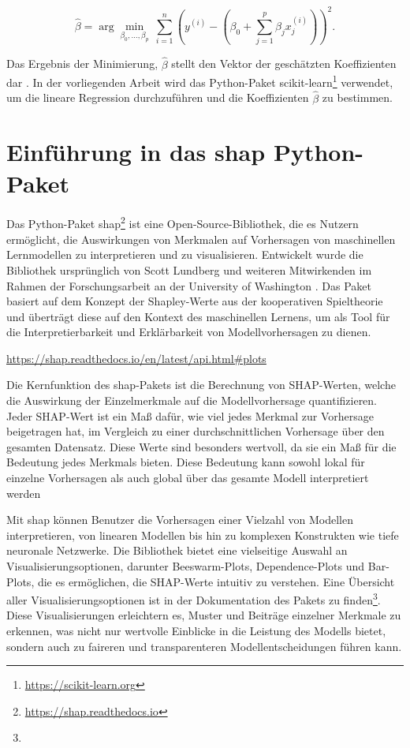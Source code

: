 \begin{equation}
    \hat{\beta} = \arg \underset{\beta_0, \ldots, \beta_p}{\min} \ \sum_{i=1}^{n} \left( y^{(i)} - \left( \beta_0 + \sum_{j=1}^{p} \beta_j x_j^{(i)}\right)\right)^2.
\end{equation}

Das Ergebnis der Minimierung, \( \hat{\beta} \) stellt den Vektor der geschätzten Koeffizienten dar \cite[S. 37]{Molnar_2022}. 
In der vorliegenden Arbeit wird das Python-Paket \textsf{scikit-learn}\footnote{\url{https://scikit-learn.org}} verwendet, um die lineare Regression durchzuführen und die Koeffizienten 
\( \hat{\beta} \) zu bestimmen. 


\section{Einführung in das \textsf{shap} Python-Paket}
\label{sec:shap-package}

Das Python-Paket \textsf{shap}\footnote{\url{https://shap.readthedocs.io}} ist eine Open-Source-Bibliothek, die es Nutzern ermöglicht, 
die Auswirkungen von Merkmalen auf Vorhersagen von maschinellen Lernmodellen zu interpretieren und zu visualisieren. 
Entwickelt wurde die Bibliothek ursprünglich von Scott Lundberg und weiteren Mitwirkenden im Rahmen der Forschungsarbeit 
an der University of Washington \cite{NIPS2017_8a20a862}. Das Paket basiert auf dem Konzept der Shapley-Werte aus der kooperativen Spieltheorie 
und überträgt diese auf den Kontext des maschinellen Lernens, um als Tool für die Interpretierbarkeit und Erklärbarkeit 
von Modellvorhersagen zu dienen.

\urldef{\ploturl}\url{https://shap.readthedocs.io/en/latest/api.html#plots}

Die Kernfunktion des \textsf{shap}-Pakets ist die Berechnung von SHAP-Werten, welche die Auswirkung der 
Einzelmerkmale auf die Modellvorhersage quantifizieren. Jeder SHAP-Wert ist ein Maß dafür, wie viel jedes Merkmal 
zur Vorhersage beigetragen hat, im Vergleich zu einer durchschnittlichen Vorhersage über den gesamten Datensatz. 
Diese Werte sind besonders wertvoll, da sie ein Maß für die Bedeutung jedes Merkmals bieten. Diese Bedeutung kann 
sowohl lokal für einzelne Vorhersagen als auch global über das gesamte Modell interpretiert werden

Mit \textsf{shap} können Benutzer die Vorhersagen einer Vielzahl von Modellen interpretieren, 
von linearen Modellen bis hin zu komplexen Konstrukten wie tiefe neuronale Netzwerke. 
Die Bibliothek bietet eine vielseitige Auswahl an Visualisierungsoptionen, darunter Beeswarm-Plots, Dependence-Plots und 
Bar-Plots, die es ermöglichen, die SHAP-Werte intuitiv zu verstehen. Eine Übersicht aller Visualisierungsoptionen ist in der Dokumentation 
des Pakets zu finden\footnote{\ploturl}.
Diese Visualisierungen erleichtern es, Muster und Beiträge einzelner Merkmale zu erkennen, 
was nicht nur wertvolle Einblicke in die Leistung des Modells bietet, sondern auch zu faireren und transparenteren 
Modellentscheidungen führen kann. 


